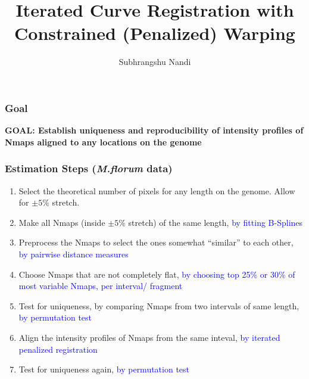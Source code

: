 \documentclass[10pt,dvipsnames,table]{beamer}
\title[Uniqueness and Reproducibility of Nmaps]{Iterated Curve Registration with Constrained (Penalized) Warping}
\author{Subhrangshu Nandi}
\begin{document}
\setlength{\baselineskip}{16truept}
\frame{\maketitle}



\begin{frame}
\frametitle{Goal}
{\bf{GOAL: Establish uniqueness and reproducibility of intensity profiles of Nmaps aligned to any locations on the genome}}
\end{frame}

\begin{frame}
\frametitle{Estimation Steps ({\emph{M.florum}} data)}
\begin{enumerate}
\item Select the theoretical number of pixels for any length on the genome. Allow for $\pm 5\%$ stretch. 
\item Make all Nmaps (inside $\pm 5\%$ stretch) of the same length, {\textcolor{blue}{by fitting B-Splines}}
\item Preprocess the Nmaps to select the ones somewhat ``similar'' to each other, {\textcolor{blue}{by pairwise distance measures}}
\item Choose Nmaps that are not completely flat, {\textcolor{blue}{by choosing top 25\% or 30\% of most variable Nmaps, per interval/ fragment}}
\item Test for uniqueness, by comparing Nmaps from two intervals of same length, {\textcolor{blue}{by permutation test}}
\item Align the intensity profiles of Nmaps from the same inteval, {\textcolor{blue}{by iterated penalized registration}}
\item Test for uniqueness again, {\textcolor{blue}{by permutation test}}
\end{enumerate}
\end{frame}

\begin{frame}
\frametitle{}

\end{frame}
\end{document}
